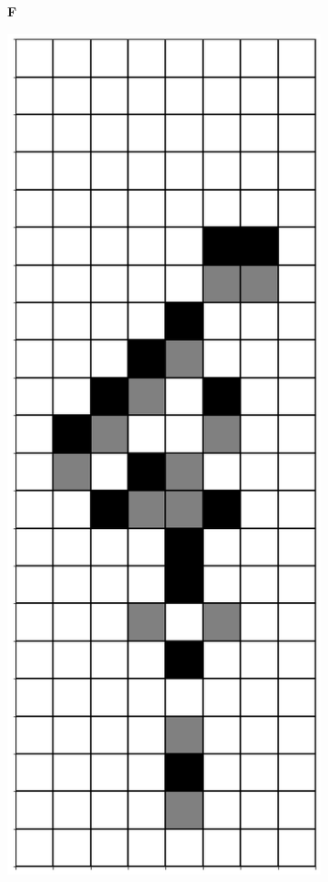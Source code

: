 \documentclass[12pt]{article}
\numberwithin{figure}{section} %
\begin{document}
\begin{figure}[H]
        	\begin{subfigure}[t]{0.03\textwidth}
    		\textbf{F}
  	\end{subfigure}	   
        	\begin{subfigure}{0.18\textwidth}
     		\centering
     		\includegraphics[width=\linewidth]{Section4/20.0}

\end{subfigure}
\end{figure}
\end{document}
